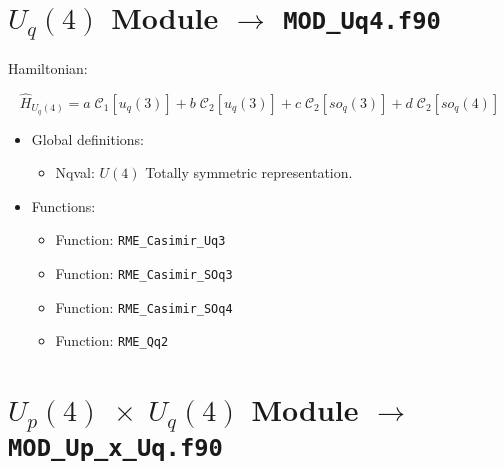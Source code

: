 \documentclass[english,twoside, openright]{report}
\newcommand{\cas}[2]{
  \mathcal{C}_{#1}\left[#2\right]
  }
\begin{document}
\section{$U_q(4)$ Module $\rightarrow$ \texttt{MOD\_Uq4.f90}}

Hamiltonian:

\begin{equation}
  \hat{H}_{U_q(4)} = a \; \cas{1}{u_q(3)} + b \; \cas{2}{u_q(3)} + c \; \cas{2}{so_q(3)} + d \; \cas{2}{so_q(4)}
\end{equation}

\begin{itemize}
\item Global definitions:
  \begin{itemize}
  \item Nqval: $U(4)$ Totally symmetric representation.
  \end{itemize}
\item Functions:
  \begin{itemize}
  \item Function: \texttt{RME\_Casimir\_Uq3}
  \item Function: \texttt{RME\_Casimir\_SOq3}
  \item Function: \texttt{RME\_Casimir\_SOq4}
  \item Function: \texttt{RME\_Qq2}
  \end{itemize}
\end{itemize}

\section{$U_p(4)\;\times\;U_q(4)$ Module $\rightarrow$ \texttt{MOD\_Up\_x\_Uq.f90}}
\end{document}
